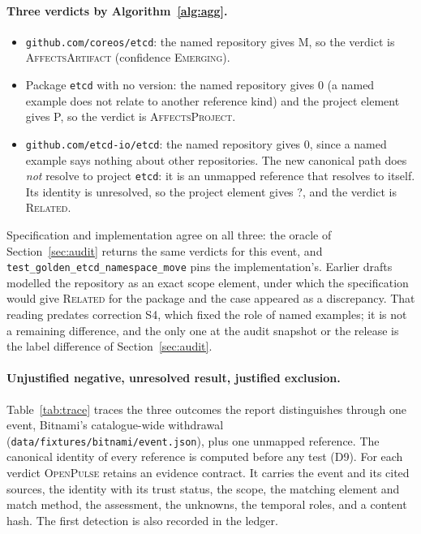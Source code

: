 \documentclass[11pt,a4paper]{article}
\newcommand{\op}{\textsc{OpenPulse}}
\newcommand{\code}[1]{\texttt{#1}}
\newcommand{\Mem}{\textsf{M}}
\newcommand{\Ind}{\textsf{?}}
\newcommand{\Proj}{\textsf{P}}
\newcommand{\NoA}{\textsf{0}}
\begin{document}
\paragraph{Three verdicts by Algorithm~\ref{alg:agg}.}
\begin{itemize}[leftmargin=*,nosep]
  \item \code{github.com/coreos/etcd}: the named repository gives
    \Mem{}, so the verdict is \textsc{AffectsArtifact} (confidence
    \textsc{Emerging}).
  \item Package \code{etcd} with no version: the named repository
    gives \NoA{} (a named example does not relate to another reference
    kind) and the project element gives \Proj{}, so the verdict is
    \textsc{AffectsProject}.
  \item \code{github.com/etcd-io/etcd}: the named repository gives
    \NoA{}, since a named example says nothing about other
    repositories. The new canonical path does \emph{not} resolve to
    project \code{etcd}: it is an unmapped reference that resolves to
    itself. Its identity is unresolved, so the project element gives
    \Ind{}, and the verdict is \textsc{Related}.
\end{itemize}
Specification and implementation agree on all three: the oracle of
Section~\ref{sec:audit} returns the same verdicts for this event, and
\code{test\_golden\_etcd\_namespace\_move} pins the implementation's.
Earlier drafts modelled the repository as an exact scope element,
under which the specification would give \textsc{Related} for the
package and the case appeared as a discrepancy. That reading predates
correction S4, which fixed the role of named examples; it is not a
remaining difference, and the only one at the audit snapshot or the
release is the label
difference of Section~\ref{sec:audit}.

\paragraph{Unjustified negative, unresolved result, justified
exclusion.} Table~\ref{tab:trace} traces the three outcomes the report
distinguishes through one event, Bitnami's catalogue-wide withdrawal
(\code{data/fixtures/bitnami/event.json}), plus one unmapped
reference. The canonical identity of every reference is computed
before any test (D9). For each verdict \op{} retains an evidence
contract. It carries the event and its cited sources, the identity
with its trust status, the scope, the matching element and match
method, the assessment, the unknowns, the temporal roles, and a
content hash. The first detection is also recorded in the ledger.
\end{document}

